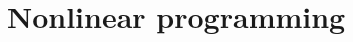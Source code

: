 \begin{comment}
\begin{figure}[!htbp]
  \centering
  \resizebox{0.5\textwidth}{!}{
    \begin{tikzpicture}[>=latex]
        \draw[fill,color=gray!70] (-0.2,2) rectangle (3.2,2.5);
        \draw[line width=1.2pt] (0, 2) node(nodeA){} -- (3, 2) node(nodeB){} -- (3, -1) -- (6, -1) node(nodeC){} -- (6, -4) node(nodeD){} -- (0, -4) node(nodeE){} -- cycle;
        
        \draw (nodeA) -- ++(0,1) coordinate (D1) -- +(0,5pt);
        \draw (nodeB) -- ++(0,1) coordinate (D2) -- +(0,5pt);
        \draw [dimen] (D1) -- (D2) node {50 mm};

        \draw (nodeA) -- ++(-1,0) coordinate (D1) -- +(-5pt,0);
        \draw (nodeE) -- ++(-1,0) coordinate (D2) -- +(-5pt,0);
        \draw [dimen] (D1) -- (D2) node {100 mm};

        \draw (nodeC) -- ++(1,0) coordinate (D1) -- +(5pt,0);
        \draw (nodeD) -- ++(1,0) coordinate (D2) -- +(5pt,0);
        \draw [dimen] (D1) -- (D2) node {50 mm};

        \draw (nodeE) -- ++(0,-1) coordinate (D1) -- +(0,-5pt);
        \draw (nodeD) -- ++(0,-1) coordinate (D2) -- +(0,-5pt);
        \draw [dimen] (D1) -- (D2) node {100 mm};

        \draw[->,line width=1pt] (6,-2.5) -- (6.2,-2.5) -- (6.2,-3.15);
        \node (arrowhead) at (6.2,-3.25) {F};
    \end{tikzpicture} \newline
  }
  \caption{L-shaped beam problem}
  \label{fig:LBeam}
\end{figure}

\end{comment}

\newpage
\section{Nonlinear programming}

